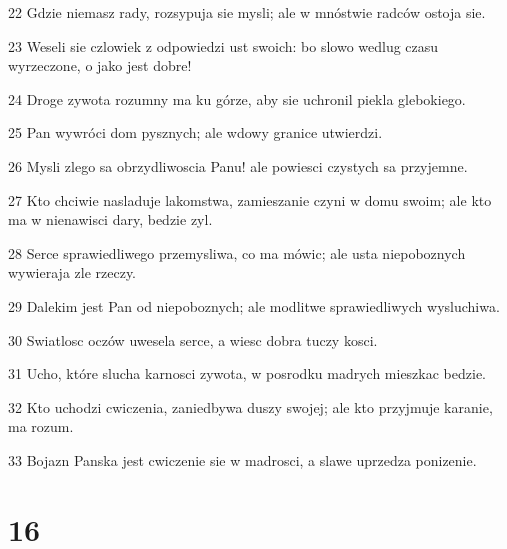\par 22 Gdzie niemasz rady, rozsypuja sie mysli; ale w mnóstwie radców ostoja sie.
\par 23 Weseli sie czlowiek z odpowiedzi ust swoich: bo slowo wedlug czasu wyrzeczone, o jako jest dobre!
\par 24 Droge zywota rozumny ma ku górze, aby sie uchronil piekla glebokiego.
\par 25 Pan wywróci dom pysznych; ale wdowy granice utwierdzi.
\par 26 Mysli zlego sa obrzydliwoscia Panu! ale powiesci czystych sa przyjemne.
\par 27 Kto chciwie nasladuje lakomstwa, zamieszanie czyni w domu swoim; ale kto ma w nienawisci dary, bedzie zyl.
\par 28 Serce sprawiedliwego przemysliwa, co ma mówic; ale usta niepoboznych wywieraja zle rzeczy.
\par 29 Dalekim jest Pan od niepoboznych; ale modlitwe sprawiedliwych wysluchiwa.
\par 30 Swiatlosc oczów uwesela serce, a wiesc dobra tuczy kosci.
\par 31 Ucho, które slucha karnosci zywota, w posrodku madrych mieszkac bedzie.
\par 32 Kto uchodzi cwiczenia, zaniedbywa duszy swojej; ale kto przyjmuje karanie, ma rozum.
\par 33 Bojazn Panska jest cwiczenie sie w madrosci, a slawe uprzedza ponizenie.

\chapter{16}

